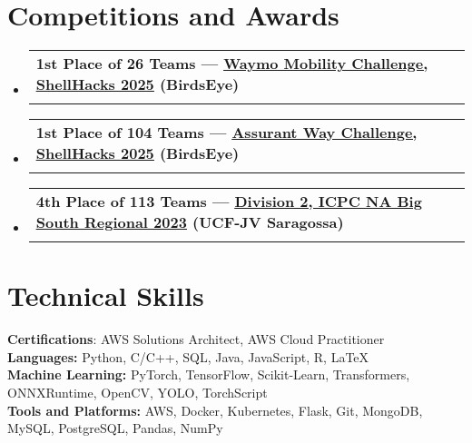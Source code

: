 \documentclass[letterpaper,11pt]{article}
\makeatletter
\newcommand{\resumeSubheading}[4]{
  \vspace{-2pt}\item
    \begin{tabular*}{0.97\textwidth}[t]{l@{\extracolsep{\fill}}r}
      \textbf{#1} & #2 \\
      \textit{\small#3} & \textit{\small #4} \\
    \end{tabular*}\vspace{-7pt}
}
\newcommand{\resumeSubHeadingListStart}{\begin{itemize}[leftmargin=0.15in, label={}]}
\newcommand{\resumeSubHeadingListEnd}{\end{itemize}}
\makeatother
\begin{document}
\section{Competitions and Awards}
  \resumeSubHeadingListStart
    \resumeSubheading
    {1st Place of 26 Teams --- \href{https://devpost.com/software/birdseye-ck0j12}{\uline{Waymo Mobility Challenge, ShellHacks 2025}} (BirdsEye)}{}{}{}
    \vspace{-1em}
    \resumeSubheading
    {1st Place of 104 Teams --- \href{https://devpost.com/software/birdseye-ck0j12}{\uline{Assurant Way Challenge, ShellHacks 2025}} (BirdsEye)}{}{}{}
    \vspace{-1em}
    \resumeSubheading
    {4th Place of 113 Teams --- \href{https://nasouth23.kattis.com/contests/nasouth23d2hidden/standings}{\uline{Division 2, ICPC NA Big South Regional 2023}} (UCF-JV Saragossa)}{}{}{}
  \resumeSubHeadingListEnd

\section{Technical Skills}
  \begin{itemize}[leftmargin=0.15in, label={}]
    \small{\item{
      \textbf{Certifications}: AWS Solutions Architect, AWS Cloud Practitioner \\
      \textbf{Languages:}{ Python, C/C++, SQL, Java, JavaScript, R, LaTeX} \\
      \textbf{Machine Learning:}{ PyTorch, TensorFlow, Scikit-Learn, Transformers, ONNXRuntime, OpenCV, YOLO, TorchScript} \\
      \textbf{Tools and Platforms:}{ AWS, Docker, Kubernetes, Flask, Git, MongoDB, MySQL, PostgreSQL, Pandas, NumPy}
    }}
  \end{itemize}
\end{document}
